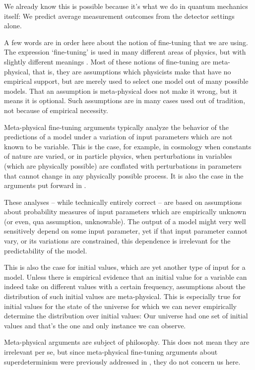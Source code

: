 \documentclass[12pt]{article}
\begin{document}
We already know this is possible because it's what we do in quantum mechanics itself: We predict average measurement outcomes from the 
detector settings alone. 



A few words are in order here about the notion of fine-tuning that we are using. The expression `fine-tuning' is used in many different areas of physics, but with slightly different meanings \cite{Hossenfelder:2018ikr,lim}. Most of these notions of fine-tuning are meta-physical, that is, they are assumptions which physicists make that have no empirical support, but are merely used to select one model out of many possible models.  That an assumption is meta-physical does not make it wrong, but it means it is optional. Such assumptions are in many cases used out of tradition, not because of empirical necessity.

Meta-physical fine-tuning arguments typically analyze the behavior of the predictions of a model under a variation of input parameters which are not known to be variable. This is the case, for example, in cosmology when constants of nature are varied, or in particle physics, when perturbations in variables (which are physically possible) are conflated with perturbations in parameters that cannot change in any physically possible process. It is also the case in the arguments put forward in \cite{finetuning,Valentini1,Valentini2}. 

These analyses -- while technically entirely correct -- are based on assumptions about probability measures of input parameters which are empirically unknown (or even, qua assumption, unknowable). The output of a model might very well sensitively depend on some input parameter, yet if that input parameter cannot vary, or its variations are constrained, this dependence is irrelevant for the predictability of the model. 

This is also the case for initial values, which are yet another type of input for a model. 
Unless there is empirical evidence that an initial value for a variable can indeed take on different values with a certain frequency, assumptions about the distribution of such initial values are meta-physical. This is especially true for initial values for the state of the universe for which we can never empirically determine the distribution over initial values: Our universe had one set of initial values and that's the one and only instance we can observe. 

Meta-physical arguments are  subject of philosophy. This does not mean they are irrelevant per se, but since meta-physical fine-tuning arguments about superdeterminism were previously addressed in \cite{Hossenfelder:2019shy,otherpaper}, they do not concern us here.
\end{document}
